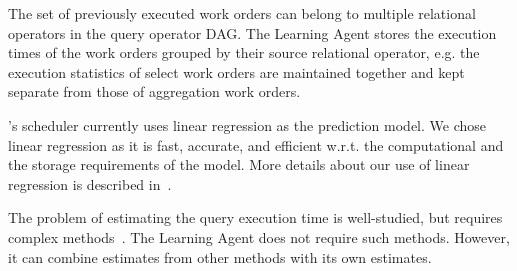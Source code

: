 The set of previously executed work orders can belong to multiple relational operators in the query operator DAG. 
The Learning Agent stores the execution times of the work orders grouped by their source relational operator, e.g. the execution statistics of select work orders are maintained together and kept separate from those of aggregation work orders. 

\sys{}'s scheduler currently uses linear regression as the prediction model.
We chose linear regression as it is fast, accurate, and efficient w.r.t. the computational and the storage requirements of the model. 
More details about our use of linear regression is described in~\cite{supplement}.

The problem of estimating the query execution time is well-studied, but requires complex methods~\cite{duggan2011performance, wu2013towards, li2012gslpi, 
chaudhuri2004estimating}. 
The Learning Agent does not require such methods. 
However, it can combine estimates from other methods with its own estimates.
